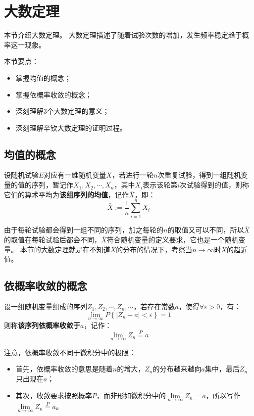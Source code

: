 \section{大数定理}

本节介绍大数定理。
大数定理描述了随着试验次数的增加，发生频率稳定趋于概率这一现象。

本节要点：
\begin{itemize}
    \item 掌握均值的概念；
    \item 掌握依概率收敛的概念；
    \item 深刻理解3个大数定理的意义；
    \item 深刻理解辛钦大数定理的证明过程。
\end{itemize}

\subsection{均值的概念}

\begin{definition}[均值]
设随机试验$E$对应有一维随机变量$X$，若进行一轮$n$次重复试验，得到一组随机变量的值的序列，暂记作$X_1,X_2,\cdots ,X_n$，其中$X_i$表示该轮第$i$次试验得到的值，则称它们的算术平均为{\bf 该组序列的均值}，记作$\bar{X}$，即：
\[
\bar{X}:=\frac{1}{n}\sum_{i=1}^n{X_i}
\]
\end{definition}

由于每轮试验都会得到一组不同的序列，加之每轮的$n$的取值又可以不同，所以$\bar{X}$的取值在每轮试验后都会不同，$\bar{X}$符合随机变量的定义要求，它也是一个随机变量。
本节的大数定理就是在不知道$\bar{X}$的分布的情况下，考察当$n\rightarrow \infty $时$\bar{X}$的趋近值。

\subsection{依概率收敛的概念}

\begin{definition}[依概率收敛]
设一组随机变量组成的序列$Z_1,Z_2,\cdots ,Z_n,\cdots $，若存在常数$a$，使得$\forall \varepsilon >0$，有：
\[
\underset{n\rightarrow \infty}{\lim}P\left\{ \left| Z_n-a \right|<\varepsilon \right\} =1
\]
则称{\bf 该序列依概率收敛于$a$}，记作：
\[
\underset{n\rightarrow \infty}{\lim}Z_n\overset{P}{=}a
\]
\end{definition}

注意，依概率收敛不同于微积分中的极限：
\begin{itemize}
    \item 首先，依概率收敛的意思是随着$n$的增大，$Z_n$的分布越来越向$a$集中，最后$Z_n$只出现在$a$；
    \item 其次，收敛要求按照概率$P$，而非形如微积分中的$\underset{n\rightarrow \infty}{\lim}Z_n=a$，所以写作$\underset{n\rightarrow \infty}{\lim}Z_n\overset{P}{=}a$。
\end{itemize}

